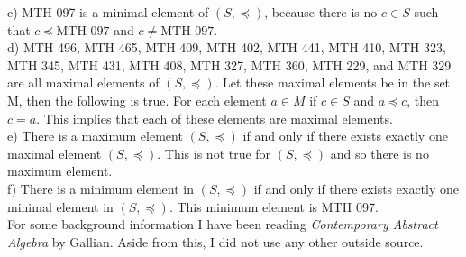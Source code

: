 \documentclass[12pt]{article}
\begin{document}
\noindent c) MTH 097 is a minimal element of $(S,\preccurlyeq)$, because there is no $c\in S$ such that $c \preccurlyeq \text{MTH } 097$ and $c \neq \text{MTH } 097.$\\

\noindent d) MTH 496, MTH 465, MTH 409, MTH 402, MTH 441, MTH 410, MTH 323, MTH 345, MTH 431, MTH 408, MTH 327, MTH 360, MTH 229, and MTH 329 are all maximal elements of $(S, \preccurlyeq)$. Let these maximal elements be in the set M, then the following is true. For each element $a\in M$ if $c \in S$ and $a \preccurlyeq c$, then $c = a$.  This implies that each of these elements are maximal elements.\\

\noindent e) There is a maximum element $(S,\preccurlyeq)$ if and only if there exists exactly one maximal element $(S,\preccurlyeq)$. This is not true for $(S,\preccurlyeq)$ and so there is no maximum element.\\

\noindent f) There is a minimum element in $(S,\preccurlyeq)$ if and only if there exists exactly one minimal element in $(S,\preccurlyeq)$. This minimum element is MTH 097.\\


For some background information I have been reading {\it Contemporary Abstract Algebra} by Gallian. Aside from this, I did not use any other outside source.
\end{document}
